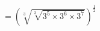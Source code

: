 \documentclass[preview]{standalone}
\begin{document}
\begin{align*}
= \left( \sqrt[3]{\sqrt[3]{3^5 \times 3^6 \times 3^7}} \right)^\frac{1}{2}
\end{align*}
\end{document}
